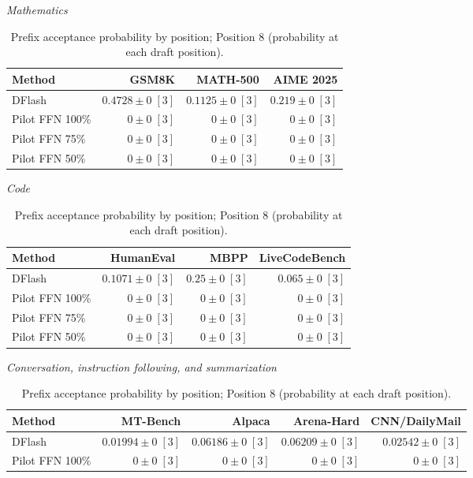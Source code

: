 \documentclass[conference,onecolumn]{IEEEtran}
\begin{document}
\begin{table}[!htp]
\centering\small
\setlength{\tabcolsep}{3pt}
\caption{Prefix acceptance probability by position; Position 8 (probability at each draft position).}
\label{tab:appendix-metric-prefix-survival-8}
\textit{Mathematics}\par\smallskip
\begin{tabular}{@{}>{\raggedright\arraybackslash}p{3.7cm}rrr@{}}
\toprule
Method & GSM8K & MATH-500 & AIME 2025 \\
\midrule
DFlash & \(\mathbf{0.4728} \pm 0\;[3]\) & \(\mathbf{0.1125} \pm 0\;[3]\) & \(\mathbf{0.219} \pm 0\;[3]\) \\
Pilot FFN 100\% & \(0 \pm 0\;[3]\) & \(0 \pm 0\;[3]\) & \(0 \pm 0\;[3]\) \\
Pilot FFN 75\% & \(0 \pm 0\;[3]\) & \(0 \pm 0\;[3]\) & \(0 \pm 0\;[3]\) \\
Pilot FFN 50\% & \(0 \pm 0\;[3]\) & \(0 \pm 0\;[3]\) & \(0 \pm 0\;[3]\) \\
\bottomrule
\end{tabular}\par\medskip
\textit{Code}\par\smallskip
\begin{tabular}{@{}>{\raggedright\arraybackslash}p{3.7cm}rrr@{}}
\toprule
Method & HumanEval & MBPP & LiveCodeBench \\
\midrule
DFlash & \(\mathbf{0.1071} \pm 0\;[3]\) & \(\mathbf{0.25} \pm 0\;[3]\) & \(\mathbf{0.065} \pm 0\;[3]\) \\
Pilot FFN 100\% & \(0 \pm 0\;[3]\) & \(0 \pm 0\;[3]\) & \(0 \pm 0\;[3]\) \\
Pilot FFN 75\% & \(0 \pm 0\;[3]\) & \(0 \pm 0\;[3]\) & \(0 \pm 0\;[3]\) \\
Pilot FFN 50\% & \(0 \pm 0\;[3]\) & \(0 \pm 0\;[3]\) & \(0 \pm 0\;[3]\) \\
\bottomrule
\end{tabular}\par\medskip
\textit{Conversation, instruction following, and summarization}\par\smallskip
\begin{tabular}{@{}>{\raggedright\arraybackslash}p{3.7cm}rrrr@{}}
\toprule
Method & MT-Bench & Alpaca & Arena-Hard & CNN/DailyMail \\
\midrule
DFlash & \(\mathbf{0.01994} \pm 0\;[3]\) & \(\mathbf{0.06186} \pm 0\;[3]\) & \(\mathbf{0.06209} \pm 0\;[3]\) & \(\mathbf{0.02542} \pm 0\;[3]\) \\
Pilot FFN 100\% & \(0 \pm 0\;[3]\) & \(0 \pm 0\;[3]\) & \(0 \pm 0\;[3]\) & \(0 \pm 0\;[3]\) \\

\end{tabular}
\end{table}
\end{document}
